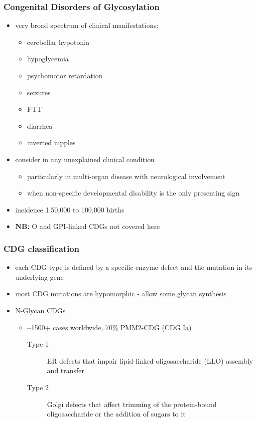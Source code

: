 \documentclass[12pt]{scrartcl}
\begin{document}
\subsubsection{Congenital Disorders of Glycosylation}
\label{sec:org7cd268e}
\begin{itemize}
\item very broad spectrum of clinical manifestations:
\begin{itemize}
\item cerebellar hypotonia
\item hypoglycemia
\item psychomotor retardation
\item seizures
\item FTT
\item diarrhea
\item inverted nipples
\end{itemize}
\item consider in any unexplained clinical condition
\begin{itemize}
\item particularly in multi-organ disease with neurological involvement
\item when non-specific developmental disability is the only presenting sign
\end{itemize}
\item incidence 1:50,000 to 100,000 births
\item \textbf{NB:} O and GPI-linked CDGs not covered here
\end{itemize}
\subsubsection{CDG classification}
\label{sec:org328ae79}
\begin{itemize}
\item each CDG type is defined by a specific enzyme defect and the mutation in its underlying gene
\item most CDG mutations are hypomorphic - allow some glycan synthesis
\item N-Glycan CDGs
\begin{itemize}
\item \textasciitilde{}1500+ cases worldwide, 70\% PMM2-CDG (CDG Ia)
\begin{description}
\item[{Type 1}] ER defects that impair lipid-linked oligosaccharide (LLO)
assembly and transfer
\item[{Type 2}] Golgi defects that affect trimming of the
protein-bound oligosaccharide or the addition of sugars to it
\end{description}
\end{itemize}
\end{itemize}
\end{document}
